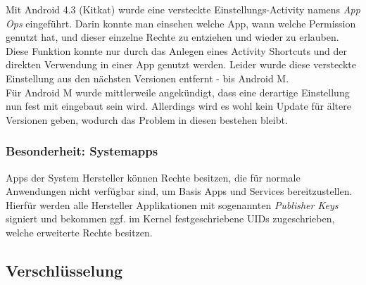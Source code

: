 	Mit Android 4.3 (Kitkat) wurde eine versteckte Einstellungs-Activity namens \textit{App Ops} eingeführt. Darin konnte man einsehen welche App, wann welche Permission genutzt hat, und dieser einzelne Rechte zu entziehen und wieder zu erlauben. Diese Funktion konnte nur durch das Anlegen eines Activity Shortcuts und der direkten Verwendung in einer App genutzt werden. Leider wurde diese versteckte Einstellung aus den nächsten Versionen entfernt - bis Android M. \cite{HiddenActivity} \\
	Für Android M wurde mittlerweile angekündigt, dass eine derartige Einstellung nun fest mit eingebaut sein wird.\cite{AndroidMPermission} Allerdings wird es wohl kein Update für ältere Versionen geben, wodurch das Problem in diesen bestehen bleibt.
	
	\subsubsection{Besonderheit: Systemapps}
	Apps der System Hersteller können Rechte besitzen, die für normale Anwendungen nicht verfügbar sind, um Basis Apps und Services bereitzustellen. Hierfür werden alle Hersteller Applikationen mit sogenannten \textit{Publisher Keys} signiert und bekommen ggf. im Kernel festgeschriebene UIDs zugeschrieben, welche erweiterte Rechte besitzen.
	
	\subsection{Verschlüsselung}
